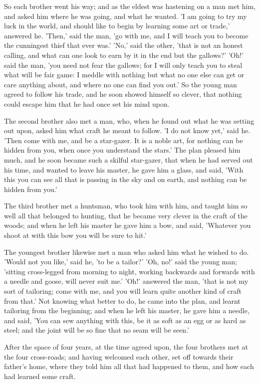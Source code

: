 \documentclass[12pt]{book}
\begin{document}
So each brother went his way; and as the eldest was hastening on a man
met him, and asked him where he was going, and what he wanted. 'I am
going to try my luck in the world, and should like to begin by
learning some art or trade,' answered he. 'Then,' said the man, 'go
with me, and I will teach you to become the cunningest thief that ever
was.' 'No,' said the other, 'that is not an honest calling, and what
can one look to earn by it in the end but the gallows?' 'Oh!' said the
man, 'you need not fear the gallows; for I will only teach you to
steal what will be fair game: I meddle with nothing but what no one
else can get or care anything about, and where no one can find you
out.' So the young man agreed to follow his trade, and he soon showed
himself so clever, that nothing could escape him that he had once set
his mind upon.

The second brother also met a man, who, when he found out what he was
setting out upon, asked him what craft he meant to follow. 'I do not
know yet,' said he. 'Then come with me, and be a star-gazer. It is a
noble art, for nothing can be hidden from you, when once you
understand the stars.' The plan pleased him much, and he soon became
such a skilful star-gazer, that when he had served out his time, and
wanted to leave his master, he gave him a glass, and said, 'With this
you can see all that is passing in the sky and on earth, and nothing
can be hidden from you.'

The third brother met a huntsman, who took him with him, and taught
him so well all that belonged to hunting, that he became very clever
in the craft of the woods; and when he left his master he gave him a
bow, and said, 'Whatever you shoot at with this bow you will be sure
to hit.'

The youngest brother likewise met a man who asked him what he wished
to do. 'Would not you like,' said he, 'to be a tailor?' 'Oh, no!' said
the young man; 'sitting cross-legged from morning to night, working
backwards and forwards with a needle and goose, will never suit me.'
'Oh!' answered the man, 'that is not my sort of tailoring; come with
me, and you will learn quite another kind of craft from that.' Not
knowing what better to do, he came into the plan, and learnt tailoring
from the beginning; and when he left his master, he gave him a needle,
and said, 'You can sew anything with this, be it as soft as an egg or
as hard as steel; and the joint will be so fine that no seam will be
seen.'

After the space of four years, at the time agreed upon, the four
brothers met at the four cross-roads; and having welcomed each other,
set off towards their father's home, where they told him all that had
happened to them, and how each had learned some craft.
\end{document}
